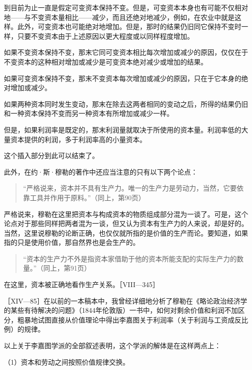 到目前为止一直是假定可变资本保持不变。但是，可变资本本身也有可能不仅相对地——与不变资本量相比——减少，而且还绝对地减少，例如，在农业中就是这样。此外，可变资本也可能绝对地增加。但是，那时的结果仍旧同它保持不变时一样，只要不变资本由于上述原因以更大程度或以同样程度增加。

如果不变资本保持不变，那末它同可变资本相比每次增加或减少的原因，仅仅在于不变资本的这种相对增加或减少是可变资本绝对减少或增加的结果。

如果可变资本保持不变，那末不变资本每次增加或减少的原因，只在于它本身的绝对增加或减少。

如果两种资本同时发生变动，那末在除去这两者相同的变动之后，所得的结果仍旧和一种资本保持不变而另一种资本有所增加或减少一样。

但是，如果利润率是既定的，那末利润量就取决于所使用的资本量。利润率低的大量资本提供的利润，多于利润率高的小量资本。


这个插入部分到此可以结束了。

此外，在约·斯·穆勒的著作中还应当注意的只有以下两个论点：

\begin{quote}{“严格说来，资本并不具有生产力。唯一的生产力是劳动力，当然，它要依靠工具并作用于原料。”（同上，第90页）}\end{quote}

严格说来，穆勒在这里把资本与构成资本的物质组成部分混为一谈了。可是，这个论点对于那些同样把两者混为一谈，但又认为资本有生产力的人来说，却是好的。当然，这里说穆勒的论断正确，也仅仅就所指的是价值的生产而论。要知道，如果指的只是使用价值，那自然界也是会生产的。

\begin{quote}{“资本的生产力不外是指资本家借助于他的资本所能支配的实际生产力的数量。”（同上，第91页）}\end{quote}

在这里，资本被正确地看作生产关系。［VIII—345］


［XIV—85］在以前的一本稿本中，我曾经详细地分析了穆勒在《略论政治经济学的某些有待解决的问题》（1844年伦敦版）一书中，如何对剩余价值和利润不加区分，粗暴地试图直接从价值理论中得出李嘉图关于利润率（关于利润与工资成反比例）的规律。


以上关于李嘉图学派的全部叙述表明，这个学派的解体是在这样两点上：

（1）资本和劳动之间按照价值规律交换。

